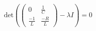 \documentclass[preview]{standalone}
\begin{document}
\begin{center}
\(\text{det}\left( \begin{pmatrix}
            0 & \frac{1}{C} \\
            \frac{-1}{L} & \frac{-R}{L}
            \end{pmatrix} - \lambda I \right) = 0\)
\end{center}
\end{document}
